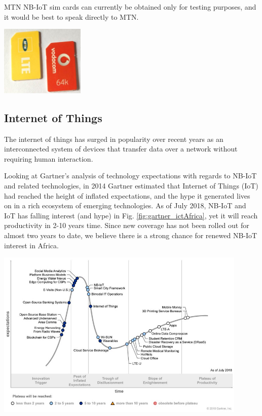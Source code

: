 \documentclass[]{article}
\let\origfigure\figure
\let\endorigfigure\endfigure
\renewenvironment{figure}[1][2] {
    \expandafter\origfigure\expandafter[H]
} {
    \endorigfigure
}
\begin{document}
MTN NB-IoT sim cards can currently be obtained only for testing
purposes, and it would be best to speak directly to MTN.

\begin{figure}
\centering
\includegraphics[width=0.3\textwidth,height=\textheight]{../images/LTE-Sims-640-1572213347177.jpg}
\caption{Vodacom and MTN NB-IoT SIM cards}
\end{figure}

\href{../images/MTN-Sim-card.jpg}{}

\hypertarget{iot}{%
\subsection{Internet of Things}\label{iot}}

The internet of things has surged in popularity over recent years as an
interconnected system of devices that transfer data over a network
without requiring human interaction.

Looking at Gartner's analysis of technology expectations with regards to
NB-IoT and related technologies, in 2014 Gartner estimated that Internet
of Things (IoT) had reached the height of inflated expectations, and the
hype it generated lives on in a rich ecosystem of emerging technologies.
As of July 2018, NB-IoT and IoT has falling interest (and hype) in Fig.
\ref{fig:gartner_ictAfrica}, yet it will reach productivity in 2-10
years time. Since new coverage has not been rolled out for almost two
years to date, we believe there is a strong chance for renewed NB-IoT
interest in Africa.

\href{../images/hype-cycle-2014-100371840-large.idge.jpeg}{}

\begin{figure}
\centering
\includegraphics[width=0.9\textwidth,height=\textheight]{../images/42881085945_739bbdc8e9_c.jpg}
\caption{\href{http://www.gartner.com/newsroom/id/3884512}{Gartner's
2018 Hype Cycle for ICT in Africa. NB-IoT is high on the list of
expectations. \label{fig:gartner_ictAfrica}}}
\end{figure}
\end{document}
